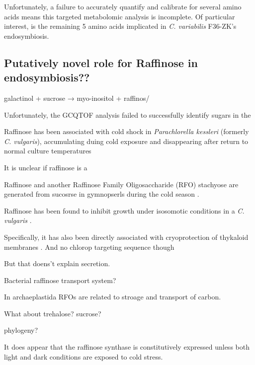 Unfortunately, a failure to accurately quantify and calibrate
for several amino acids means this targeted metabolomic analysis
is incomplete.  Of particular interest, is the remaining 5 amino acids
implicated in \textit{C. variabilis} F36-ZK's endosymbiosis.








\subsection{Putatively novel role for Raffinose in endosymbiosis??}

galactinol + sucrose → myo-inositol + raffinos/



Unfortunately, the GCQTOF analysis failed to successfully
identify sugars in the 


Raffinose has been associated with cold shock in
\textit{Parachlorella kessleri} (formerly \textit{C. vulgaris}),
accumulating duing cold exposure and disappearing after return
to normal culture temperatures 

It is unclear if raffinose is a 
\citep{Salerno1989}


Raffinose and another Raffinose Family Oligosaccharide (RFO) 
stachyose are generated from sucosrse in gymnopserls during
the cold season \citep{Kandler1982}.

Raffinose has been found to inhibit growth under
isosomotic conditions in a \textit{C. vulgaris} 
\citep{Setter1979}.

Specifically, it has also been directly associated
with cryoprotection of thykaloid membranes \citep{Lineberger1980}.
And no chlorop targeting sequence though

But that doens't explain secretion.



Bacterial raffinose transport system?


In archaeplastida RFOs are related to stroage
and transport of carbon.  



What about trehalose?
sucrose?




phylogeny?





It does appear that the raffinose synthase is constitutively
expressed unless both light and dark conditions are exposed to cold stress.


